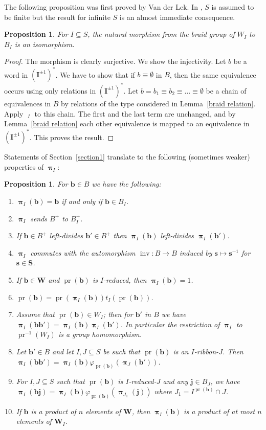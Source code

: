 \documentclass{amsart}
\numberwithin{equation}{section}
\newtheorem{proposition}[equation]{Proposition}
\newcommand\inv{^{-1}}
\newcommand\bb{{\mathbf b}}
\newcommand\bj{{\mathbf j}}
\newcommand\bs{{\mathbf s}}
\newcommand\bI{{\mathbf I}}
\newcommand\bS{{\mathbf S}}
\newcommand\bW{{\mathbf W}}
\DeclareMathOperator\inverse{inv}
\DeclareMathOperator\pr{pr}
\DeclareMathOperator\hpi{\hat\pi}
\DeclareMathOperator\bpi{\boldsymbol\pi}
\begin{document}
The following proposition was first proved by Van der Lek.  In \cite{VanderLek}, $S$ is assumed to be finite but the
result for infinite $S$ is an almost immediate consequence. 
\begin{proposition}\label{vdl}For  $I\subseteq S$, the natural  morphism from the braid group
of $W_I$ to $B_I$ is an isomorphism.
\end{proposition}
\begin{proof}The morphism is clearly surjective.
We show the injectivity. Let $b$ be a word in $(\bI^{\pm1})^*$. We have to show that if 
$b\equiv\emptyset$ in $B$, then the same equivalence occurs using only
relations in $(\bI^{\pm1})^*$. Let $b=b_1\equiv b_2\equiv\ldots\equiv\emptyset$
be a chain of equivalences in $B$ by relations of the type considered in
Lemma~\ref{braid relation}. Apply $\hpi_I$ to this chain. The first and
the last term are unchanged, and by Lemma~\ref{braid relation} each other
equivalence is mapped to an equivalence in $(\bI^{\pm1})^*$. This proves the
result.
\end{proof}
Statements of Section~\ref{section1} translate to the following (sometimes
weaker) properties of $\bpi_I$:
\begin{proposition}\label{fourre-tout} For $\bb\in B$ we have the following:
\begin{enumerate}
\item\label{ft6}
$\bpi_I(\bb)=\bb$ if and only if $\bb\in B_I$.
\item\label{ft7} $\bpi_I$ sends $B^+$  to $B_I^+$.
\item\label{ft8} If $\bb\in B^+$ left-divides $\bb'\in B^+$
then $\bpi_I(\bb)$ left-divides $\bpi_I(\bb')$.
\item\label{ft9} $\bpi_I$ commutes with the automorphism $\inverse: B\to B$ \index{inv@$\inverse$}
 induced by $\bs\mapsto\bs\inv$ for $\bs\in\bS$.
\item\label{ft5} If $\bb\in\bW$ and $\pr(\bb)$ is $I$-reduced, then $\bpi_I(\bb)=1$.
\item\label{ft1} $\pr(\bb)=\pr(\bpi_I(\bb))t_I(\pr(\bb))$.
\item\label{ft2} Assume that $\pr(\bb)\in W_I$; then for $\bb'$ in $B$  we have
$\bpi_I(\bb\bb')=\bpi_I(\bb)\bpi_I(\bb')$. In particular the restriction of
$\bpi_I$ to $\pr\inv(W_I)$ is a group homomorphism.
\item\label{ft3} Let $\bb'\in B$ and let  $I,J\subseteq S$ be such that $\pr(\bb)$ is an
$I$-ribbon-$J$. Then $\bpi_I(\bb\bb')=
\bpi_I(\bb)\varphi_{\pr(\bb)}(\bpi_J(\bb'))$.
\item\label{ft4}  For $I,J\subseteq S$ such that $\pr(\bb)$ is $I$-reduced-$J$ and any
$\bj\in B_J$, we have $\bpi_I(\bb\bj) =
\bpi_I(\bb)\varphi_{\pr(\bb)}(\bpi_{J_1}(\bj))$ where
$J_1=I^{\pr(\bb)}\cap J$.
\item\label{ft10}  If $\bb$ is a product of $n$ elements of $\bW$, then
$\bpi_I(\bb)$ is a product of at most $n$ elements of $\bW_I$.
\end{enumerate}
\end{proposition}
\end{document}
